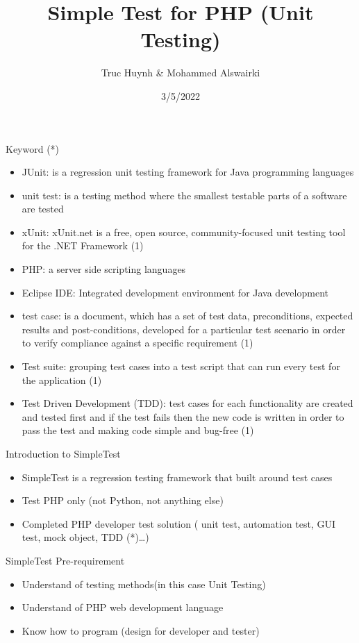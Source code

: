 \documentclass[
  ignorenonframetext,
]{beamer}
\title{Simple Test for PHP (Unit Testing)}
\author{Truc Huynh \& Mohammed Alswairki}
\date{3/5/2022}
\providecommand{\tightlist}{%
  \setlength{\itemsep}{0pt}\setlength{\parskip}{0pt}}
\begin{document}
\frame{\titlepage}

\begin{frame}{Keyword (*)}
\protect\hypertarget{keyword}{}
\begin{itemize}
\tightlist
\item
  JUnit: is a regression unit testing framework for Java programming
  languages
\item
  unit test: is a testing method where the smallest testable parts of a
  software are tested
\item
  xUnit: xUnit.net is a free, open source, community-focused unit
  testing tool for the .NET Framework (1)
\item
  PHP: a server side scripting languages
\item
  Eclipse IDE: Integrated development environment for Java development
\item
  test case: is a document, which has a set of test data, preconditions,
  expected results and post-conditions, developed for a particular test
  scenario in order to verify compliance against a specific requirement
  (1)
\item
  Test suite: grouping test cases into a test script that can run every
  test for the application (1)
\item
  Test Driven Development (TDD): test cases for each functionality are
  created and tested first and if the test fails then the new code is
  written in order to pass the test and making code simple and bug-free
  (1)
\end{itemize}
\end{frame}

\begin{frame}{Introduction to SimpleTest}
\protect\hypertarget{introduction-to-simpletest}{}
\begin{itemize}
\tightlist
\item
  SimpleTest is a regression testing framework that built around test
  cases
\item
  Test PHP only (not Python, not anything else)
\item
  Completed PHP developer test solution ( unit test, automation test,
  GUI test, mock object, TDD (*)\ldots)
\end{itemize}
\end{frame}

\begin{frame}{SimpleTest Pre-requirement}
\protect\hypertarget{simpletest-pre-requirement}{}
\begin{itemize}
\tightlist
\item
  Understand of testing methods(in this case Unit Testing)
\item
  Understand of PHP web development language
\item
  Know how to program (design for developer and tester)
\end{itemize}
\end{frame}
\end{document}
